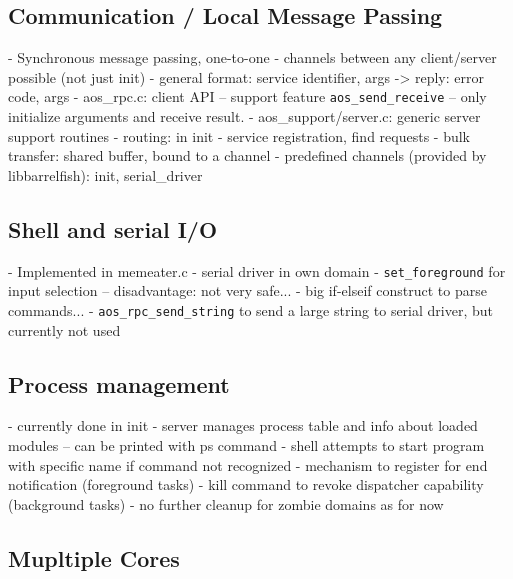 \documentclass[a4paper,10pt]{article}
\begin{document}
% 
% 
% 

\subsection{Communication / Local Message Passing}

- Synchronous message passing, one-to-one
- channels between any client/server possible (not just init)
- general format: service identifier, args -> reply: error code, args
- aos\_rpc.c: client API
-- support feature \lstinline!aos_send_receive!
-- only initialize arguments and receive result.
- aos\_support/server.c: generic server support routines
- routing: in init - service registration, find requests
- bulk transfer: shared buffer, bound to a channel
- predefined channels (provided by libbarrelfish): init, serial\_driver

\subsection{Shell and serial I/O}
- Implemented in memeater.c
- serial driver in own domain
- \lstinline!set_foreground! for input selection
-- disadvantage: not very safe...
- big if-elseif construct to parse commands...
- \lstinline!aos_rpc_send_string! to send a large string to serial driver, but currently not used

\subsection{Process management}
- currently done in init
- server manages process table and info about loaded modules
-- can be printed with ps command
- shell attempts to start program with specific name if command not recognized
- mechanism to register for end notification (foreground tasks)
- kill command to revoke dispatcher capability (background tasks)
- no further cleanup for zombie domains as for now

\subsection{Mupltiple Cores}
\end{document}
